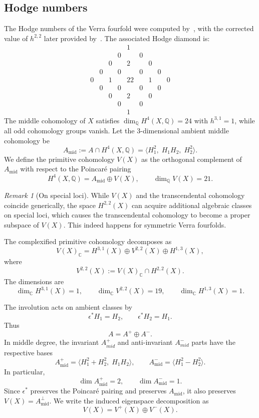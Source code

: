 \documentclass{amsart}
\theoremstyle{definition}
\theoremstyle{remark}
\newtheorem{remark}[theorem]{Remark}
\begin{document}
\subsection{Hodge numbers}
\label{sec:hodge}
The Hodge numbers of the Verra fourfold were computed by~\cite{Laterveer2019AlgebraicCA}, with the corrected value of $h^{2,2}$ later provided by~\cite{Fatighenti2022TopicsOF}. The associated Hodge diamond is:
$$\begin{array}{ccccccccc}
& & & & 1 & & & & \\
& & & 0 & & 0 & & & \\
& & 0 & & 2 & & 0 & & \\
& 0 & & 0 & & 0 & & 0 & \\
0 & & 1 & & 22 & & 1 & & 0 \\
& 0 & & 0 & & 0 & & 0 & \\
& & 0 & & 2 & & 0 & & \\
& & & 0 & & 0 & & & \\
& & & & 1 & & & &
\end{array}$$
The middle cohomology of \(X\) satisfies \(\dim_{\mathbb{Q}} H^4(X,\mathbb{Q}) = 24\) with \(h^{3,1} = 1\), while all odd cohomology groups vanish. Let the 3-dimensional ambient middle cohomology be 
\[
  A_{\mathrm{mid}} := A \cap H^4(X,\mathbb{Q}) = \langle H_1^2, \; H_1H_2, \; H_2^2 \rangle.
\]
We define the primitive cohomology \(V(X)\) as the orthogonal complement of \(A_{\mathrm{mid}}\) with respect to the Poincaré pairing
\[
  H^4(X,\mathbb{Q}) = A_{\mathrm{mid}} \oplus V(X), \qquad \dim_{\mathbb{Q}} V(X) = 21.
\]


\begin{remark}[On special loci]
While \(V(X)\) and the transcendental cohomology coincide generically, the space \(H^{2,2}(X)\) can acquire additional algebraic classes on special loci, which causes the transcendental cohomology to become a proper subspace of \(V(X)\). This indeed happens for symmetric Verra fourfolds. 
\end{remark}

The complexified primitive cohomology decomposes as
\[
  V(X)_{\mathbb{C}} = H^{3,1}(X) \oplus V^{2,2}(X) \oplus H^{1,3}(X),
\]
where
\[
  V^{2,2}(X):=V(X)_{\mathbb C}\cap H^{2,2}(X).
\]
The dimensions are
\[
  \dim_{\mathbb C}H^{3,1}(X)=1,
  \qquad
  \dim_{\mathbb C}V^{2,2}(X)=19,
  \qquad
  \dim_{\mathbb C}H^{1,3}(X)=1.
\]


The involution acts on ambient classes by
\[
  \epsilon^*H_1=H_2,
  \qquad
  \epsilon^*H_2=H_1.
\]
Thus
\[
  A=A^+\oplus A^-.
\]
In middle degree, the invariant \(A^+_{mid}\) and anti-invariant \(A^-_{mid}\) parts have the respective bases
\[
  A_{\mathrm{mid}}^+
  =
  \langle H_1^2+H_2^2,\;H_1H_2\rangle,
  \qquad
  A_{\mathrm{mid}}^-
  =
  \langle H_1^2-H_2^2\rangle .
\]
In particular,
\[
  \dim A_{\mathrm{mid}}^+=2,
  \qquad
  \dim A_{\mathrm{mid}}^-=1.
\]
Since \(\epsilon^*\) preserves the Poincaré pairing and preserves
\(A_{\mathrm{mid}}\), it also preserves $V(X)=A_{\mathrm{mid}}^\perp$. We write the induced eigenspace decomposition as
\[
  V(X)=V^+(X)\oplus V^-(X).
\]
\end{document}
